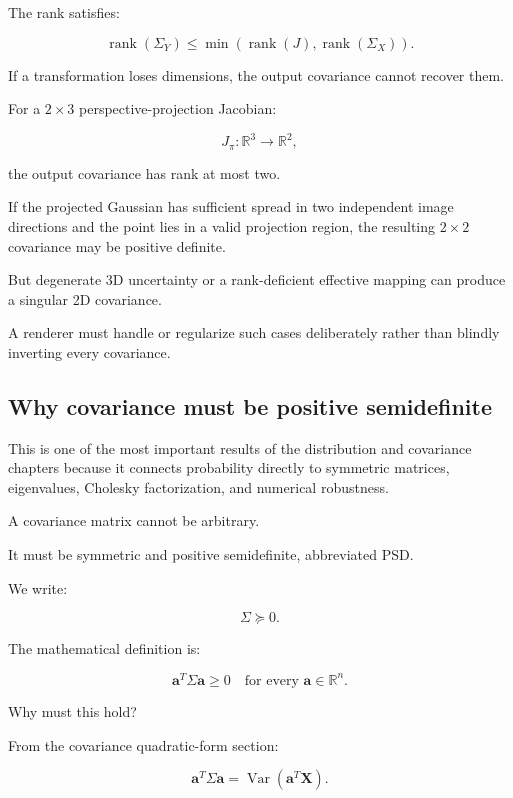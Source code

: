 The rank satisfies:

\[
 \operatorname{rank}(\Sigma_Y) \le \min(\operatorname{rank}(J),\operatorname{rank}(\Sigma_X)).
\]

If a transformation loses dimensions, the output covariance cannot recover them.

For a \(2\times3\) perspective-projection Jacobian:

\[
 J_\pi:\mathbb R^3\rightarrow\mathbb R^2,
\]

the output covariance has rank at most two.

If the projected Gaussian has sufficient spread in two independent image directions and the point lies in a valid projection region, the resulting \(2\times2\) covariance may be positive definite.

But degenerate 3D uncertainty or a rank-deficient effective mapping can produce a singular 2D covariance.

A renderer must handle or regularize such cases deliberately rather than blindly inverting every covariance.

\subsection{Why covariance must be positive semidefinite}\label{02-foundations-ii-ch024-why-covariance-must-be-positive-semidefinite}

\hypertarget{02-foundations-ii-ch024-why-covariance-must-be-positive-semidefinite}{}

This is one of the most important results of the distribution and covariance chapters because it connects probability directly to symmetric matrices, eigenvalues, Cholesky factorization, and numerical robustness.

A covariance matrix cannot be arbitrary.

It must be symmetric and positive semidefinite, abbreviated PSD.

We write:

\[
 \boxed{\Sigma\succeq0}.
\]

The mathematical definition is:

\[
 \boxed{ \mathbf a^T\Sigma\mathbf a\ge0 \quad\text{for every }\mathbf a\in\mathbb R^n }.
\]

Why must this hold?

From the covariance quadratic-form section:

\[
 \mathbf a^T\Sigma\mathbf a = \operatorname{Var}(\mathbf a^T\mathbf X).
\]

